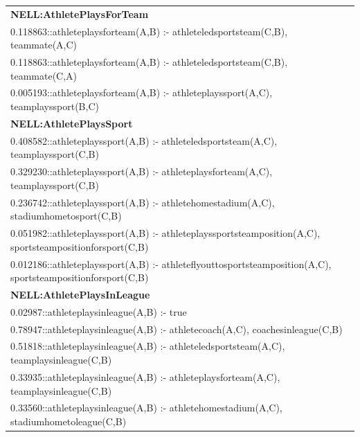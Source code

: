 \documentclass[akbc,twoside,11pt]{article}
\newcommand{\arcchit}[1]{\textcolor{red}{A: {#1}}}
\begin{document}
\begin{footnotesize}
\begin{tabular}{|l|}
\hline
\textbf{NELL:AthletePlaysForTeam} \\
0.118863::athleteplaysforteam(A,B) :- athleteledsportsteam(C,B), teammate(A,C) \\
0.118863::athleteplaysforteam(A,B) :- athleteledsportsteam(C,B), teammate(C,A) \\
0.005193::athleteplaysforteam(A,B) :- athleteplayssport(A,C), teamplayssport(B,C) \\[2ex]
\textbf{NELL:AthletePlaysSport} \\
0.408582::athleteplayssport(A,B) :- athleteledsportsteam(A,C), teamplayssport(C,B) \\
0.329230::athleteplayssport(A,B) :- athleteplaysforteam(A,C), teamplayssport(C,B) \\
0.236742::athleteplayssport(A,B) :- athletehomestadium(A,C), stadiumhometosport(C,B) \\
0.051982::athleteplayssport(A,B) :- athleteplayssportsteamposition(A,C), sportsteampositionforsport(C,B) \\
0.012186::athleteplayssport(A,B) :- athleteflyouttosportsteamposition(A,C), sportsteampositionforsport(C,B) \\[2ex]
\textbf{NELL:AthletePlaysInLeague} \\
0.02987::athleteplaysinleague(A,B) :- true \\
0.78947::athleteplaysinleague(A,B) :- athletecoach(A,C), coachesinleague(C,B) \\
0.51818::athleteplaysinleague(A,B) :- athleteledsportsteam(A,C), teamplaysinleague(C,B) \\
0.33935::athleteplaysinleague(A,B) :- athleteplaysforteam(A,C), teamplaysinleague(C,B) \\
0.33560::athleteplaysinleague(A,B) :- athletehomestadium(A,C), stadiumhometoleague(C,B) \\[2ex]

\end{tabular}
\end{footnotesize}
\end{document}
